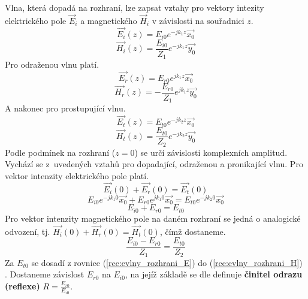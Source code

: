 Vlna, která dopadá na rozhraní, lze zapsat vztahy pro vektory intezity elektrického pole $\vec E_{i}$ a magnetického $\vec H_{i}$ v závislosti na souřadnici $z$.
\begin{displaymath}
	\vec{E_{i}}(z) = E_{i0}e^{-jk_{1}z}\vec{x_{0}}
\end{displaymath}
\begin{displaymath}
	\vec{H_{i}}(z) = \frac{E_{i0}}{Z_{1}}e^{-jk_{1}z}\vec{y_{0}}
\end{displaymath}
Pro odraženou vlnu platí.
\begin{displaymath}
	\vec{E_{r}}(z) = E_{r0}e^{jk_{1}z}\vec{x_{0}}
\end{displaymath}
\begin{displaymath}
	\vec{H_{r}}(z) = - \frac{E_{r0}}{Z_{1}}e^{jk_{1}z}\vec{y_{0}}
\end{displaymath}
A nakonec pro prostupující vlnu.
\begin{displaymath}
	\vec{E_{t}}(z) = E_{t0}e^{-jk_{2}z}\vec{x_{0}}
\end{displaymath}
\begin{displaymath}
	\vec{H_{t}}(z) = \frac{E_{t0}}{Z_{2}}e^{-jk_{2}z}\vec{y_{0}}
\end{displaymath}
Podle podmínek na rozhraní ($z = 0$) se určí závislosti komplexních amplitud. Vychází se z~uvedených vztahů pro dopadající, odraženou a pronikající vlnu.
Pro vektor intenzity elektrického pole platí.
\begin{displaymath}
	\vec{E_{i}}(0) + \vec{E_{r}}(0)  = \vec{E_{t}}(0)
\end{displaymath}
\begin{displaymath}
	 E_{i0}e^{-jk_{1}0}\vec{x_{0}} + E_{r0}e^{jk_{1}0}\vec{x_{0}}  = E_{t0}e^{-jk_{2}0}\vec{x_{0}}
\end{displaymath}
\begin{equation}
	E_{i0} + E_{r0}  = E_{t0}
	\label{rce:evlny_rozhrani_E}
\end{equation}
Pro vektor intenzity magnetického pole na daném rozhraní se jedná o analogické odvození, tj. $\vec{H_{i}}(0) + \vec{H_{r}}(0)  = \vec{H_{t}}(0)$, čímž dostaneme.
\begin{equation}
	\frac{E_{i0}-E_{r0}}{Z_{1}} = \frac{E_{t0}}{Z_{2}}
	\label{rce:evlny_rozhrani_H}
\end{equation}
Za $E_{t0}$ se dosadí z rovnice (\ref{rce:evlny_rozhrani_E}) do (\ref{rce:evlny_rozhrani_H}) . Dostaneme závislost $E_{r0}$ na $E_{i0}$, na jejíž základě se dle \cite{emp} definuje {\bf činitel odrazu (reflexe)}  $R = \frac{E_{r0}}{E_{i0}}$. 
